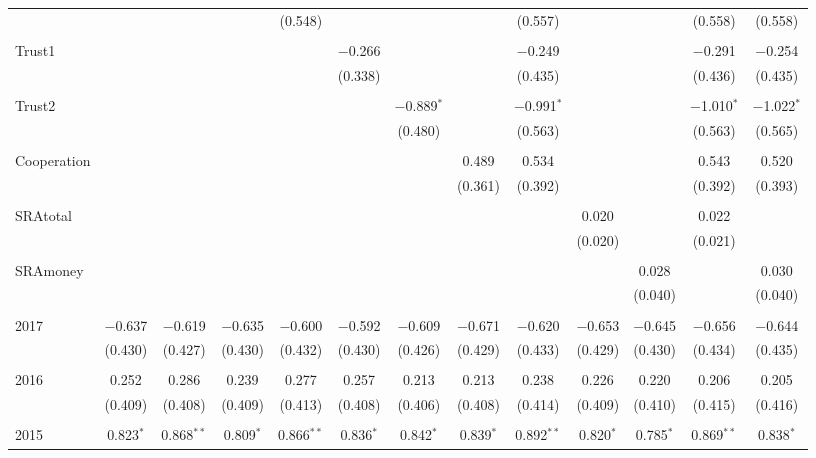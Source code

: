 \begin{table}[H]
\begin{adjustbox}{width=\textwidth}
\begin{tabular}{@{\extracolsep{5pt}}lcccccccccccc}
  &  &  &  & (0.548) &  &  &  & (0.557) &  &  & (0.558) & (0.558) \\ 
  & & & & & & & & & & & & \\ 
 Trust1 &  &  &  &  & $-$0.266 &  &  & $-$0.249 &  &  & $-$0.291 & $-$0.254 \\ 
  &  &  &  &  & (0.338) &  &  & (0.435) &  &  & (0.436) & (0.435) \\ 
  & & & & & & & & & & & & \\ 
 Trust2 &  &  &  &  &  & $-$0.889$^{*}$ &  & $-$0.991$^{*}$ &  &  & $-$1.010$^{*}$ & $-$1.022$^{*}$ \\ 
  &  &  &  &  &  & (0.480) &  & (0.563) &  &  & (0.563) & (0.565) \\ 
  & & & & & & & & & & & & \\ 
 Cooperation &  &  &  &  &  &  & 0.489 & 0.534 &  &  & 0.543 & 0.520 \\ 
  &  &  &  &  &  &  & (0.361) & (0.392) &  &  & (0.392) & (0.393) \\ 
  & & & & & & & & & & & & \\ 
 SRAtotal &  &  &  &  &  &  &  &  & 0.020 &  & 0.022 &  \\ 
  &  &  &  &  &  &  &  &  & (0.020) &  & (0.021) &  \\ 
  & & & & & & & & & & & & \\ 
 SRAmoney &  &  &  &  &  &  &  &  &  & 0.028 &  & 0.030 \\ 
  &  &  &  &  &  &  &  &  &  & (0.040) &  & (0.040) \\ 
  & & & & & & & & & & & & \\ 
 2017 & $-$0.637 & $-$0.619 & $-$0.635 & $-$0.600 & $-$0.592 & $-$0.609 & $-$0.671 & $-$0.620 & $-$0.653 & $-$0.645 & $-$0.656 & $-$0.644 \\ 
  & (0.430) & (0.427) & (0.430) & (0.432) & (0.430) & (0.426) & (0.429) & (0.433) & (0.429) & (0.430) & (0.434) & (0.435) \\ 
  & & & & & & & & & & & & \\ 
 2016 & 0.252 & 0.286 & 0.239 & 0.277 & 0.257 & 0.213 & 0.213 & 0.238 & 0.226 & 0.220 & 0.206 & 0.205 \\ 
  & (0.409) & (0.408) & (0.409) & (0.413) & (0.408) & (0.406) & (0.408) & (0.414) & (0.409) & (0.410) & (0.415) & (0.416) \\ 
  & & & & & & & & & & & & \\ 
 2015 & 0.823$^{*}$ & 0.868$^{**}$ & 0.809$^{*}$ & 0.866$^{**}$ & 0.836$^{*}$ & 0.842$^{*}$ & 0.839$^{*}$ & 0.892$^{**}$ & 0.820$^{*}$ & 0.785$^{*}$ & 0.869$^{**}$ & 0.838$^{*}$ \\ 

\end{tabular}
\end{adjustbox}
\end{table}
